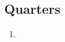 \documentclass[a5paper,11pt]{book}
\begin{document}
\begin{multicols}{2}
\subsection{Quarters}
\begin{enumerate}
\item
\end{enumerate}











\end{multicols}
\end{document}
